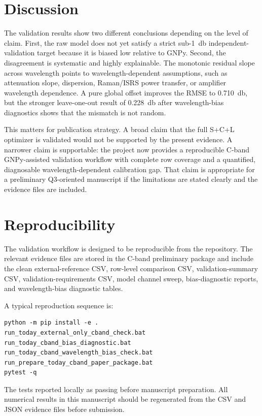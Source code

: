 \documentclass[journal]{IEEEtran}
\begin{document}
\section{Discussion}
The validation results show two different conclusions depending on the level of claim. First, the raw model does not yet satisfy a strict sub-\SI{1}{\decibel} independent-validation target because it is biased low relative to GNPy. Second, the disagreement is systematic and highly explainable. The monotonic residual slope across wavelength points to wavelength-dependent assumptions, such as attenuation slope, dispersion, Raman/ISRS power transfer, or amplifier wavelength dependence. A pure global offset improves the RMSE to \SI{0.710}{\decibel}, but the stronger leave-one-out result of \SI{0.228}{\decibel} after wavelength-bias diagnostics shows that the mismatch is not random.

This matters for publication strategy. A broad claim that the full S+C+L optimizer is validated would not be supported by the present evidence. A narrower claim is supportable: the project now provides a reproducible C-band GNPy-assisted validation workflow with complete row coverage and a quantified, diagnosable wavelength-dependent calibration gap. That claim is appropriate for a preliminary Q3-oriented manuscript if the limitations are stated clearly and the evidence files are included.

\section{Reproducibility}
The validation workflow is designed to be reproducible from the repository. The relevant evidence files are stored in the C-band preliminary package and include the clean external-reference CSV, row-level comparison CSV, validation-summary CSV, validation-requirements CSV, model channel sweep, bias-diagnostic reports, and wavelength-bias diagnostic tables.

A typical reproduction sequence is:
\begin{verbatim}
python -m pip install -e .
run_today_external_only_cband_check.bat
run_today_cband_bias_diagnostic.bat
run_today_cband_wavelength_bias_check.bat
run_prepare_today_cband_paper_package.bat
pytest -q
\end{verbatim}
The tests reported locally as passing before manuscript preparation. All numerical results in this manuscript should be regenerated from the CSV and JSON evidence files before submission.
\end{document}

